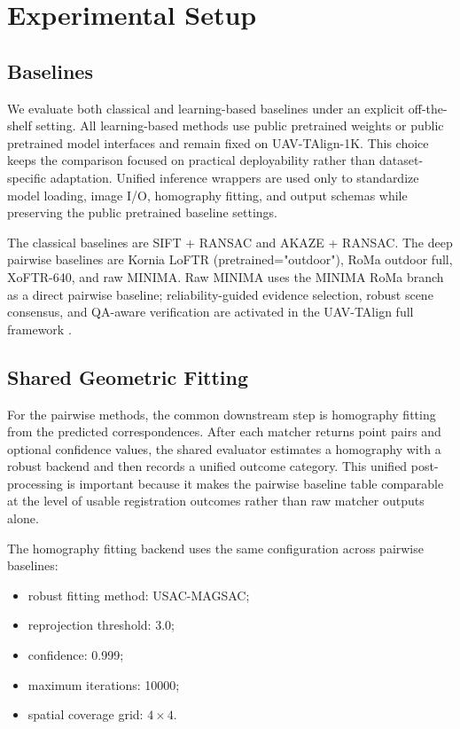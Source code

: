 
\section{Experimental Setup}

\subsection{Baselines}

We evaluate both classical and learning-based baselines under an explicit off-the-shelf setting.
All learning-based methods use public pretrained weights or public pretrained model interfaces and
remain fixed on UAV-TAlign-1K. This choice keeps the comparison focused on practical deployability
rather than dataset-specific adaptation.
Unified inference wrappers are used only to standardize model loading, image I/O, homography
fitting, and output schemas while preserving the public pretrained baseline settings.

The classical baselines are SIFT + RANSAC and AKAZE + RANSAC. The deep pairwise baselines are
Kornia LoFTR (pretrained="outdoor"), RoMa outdoor full, XoFTR-640, and raw MINIMA. Raw MINIMA uses
the MINIMA RoMa branch as a direct pairwise baseline; reliability-guided evidence selection, robust
scene consensus, and QA-aware verification are activated in the UAV-TAlign full framework
\cite{lowe2004sift,alcantarilla2013akaze,sun2021loftr,edstedt2024roma,tuzcuoglu2024xoftr,ren2025minima}.

\subsection{Shared Geometric Fitting}

For the pairwise methods, the common downstream step is homography fitting from the predicted
correspondences. After each matcher returns point pairs and optional confidence values, the
shared evaluator estimates a homography with a robust backend and then records a unified outcome
category. This unified post-processing is important because it makes the pairwise baseline
table comparable at the level of usable registration outcomes rather than raw matcher outputs
alone.

The homography fitting backend uses the same configuration across pairwise baselines:
\begin{itemize}
\item robust fitting method: USAC-MAGSAC;
\item reprojection threshold: 3.0;
\item confidence: 0.999;
\item maximum iterations: 10000;
\item spatial coverage grid: $4 \times 4$.
\end{itemize}

